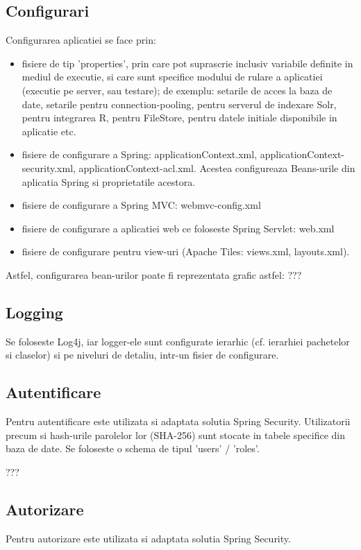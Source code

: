 \subsection{Configurari}
Configurarea aplicatiei se face prin:
\begin {itemize}
  \item fisiere de tip 'properties', prin care pot suprascrie
inclusiv variabile definite in mediul de executie, si care sunt specifice modului de rulare a
aplicatiei (executie pe server, sau testare); de exemplu: setarile de acces la
baza de date, setarile pentru connection-pooling, pentru serverul de indexare
Solr, pentru integrarea R, pentru FileStore, pentru datele initiale disponibile
in aplicatie etc.
  \item fisiere de configurare a Spring: applicationContext.xml,
  applicationContext-security.xml, applicationContext-acl.xml. Acestea
  configureaza Beans-urile din aplicatia Spring si proprietatile acestora.
  \item fisiere de configurare a Spring MVC: webmvc-config.xml
  \item fisiere de configurare a aplicatiei web ce foloseste Spring Servlet:
  web.xml
  \item fisiere de configurare pentru view-uri (Apache Tiles: views.xml,
  layouts.xml).
\end{itemize}

Astfel, configurarea bean-urilor poate fi reprezentata grafic astfel:
???

\subsection{Logging}
Se foloseste Log4j, iar logger-ele sunt configurate ierarhic (cf. ierarhiei
pachetelor si claselor) si pe niveluri de detaliu, intr-un fisier de
configurare.

\subsection{Autentificare}
Pentru autentificare este utilizata si adaptata solutia Spring Security.
Utilizatorii precum si hash-urile parolelor lor (SHA-256) sunt stocate in
tabele specifice din baza de date.
Se foloseste o schema de tipul 'users' / 'roles'.

???

\subsection{Autorizare}
Pentru autorizare este utilizata si adaptata solutia Spring Security.

